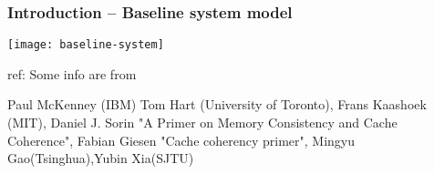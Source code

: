 %
%
\begin{frame}[plain]
	\frametitle{Introduction -- Baseline system model}


			\centering
			
			\texttt{[image: baseline-system]}


\raggedright
\tiny ref:
Some info are from

Paul McKenney (IBM) Tom Hart (University of Toronto), Frans Kaashoek (MIT), 
Daniel J. Sorin "A Primer on Memory Consistency and Cache Coherence",  Fabian Giesen "Cache coherency primer", Mingyu Gao(Tsinghua),Yubin Xia(SJTU)	
\end{frame}

